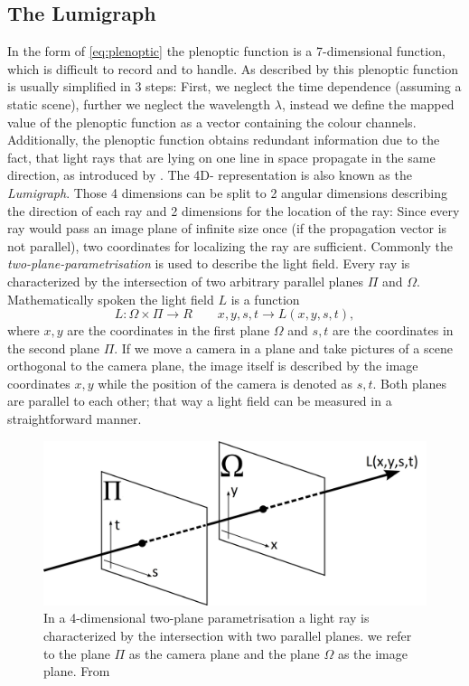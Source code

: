 \documentclass  [
  paper    = a4,
  BCOR     = 10mm,
  twoside,
  fontsize = 12pt,
  fleqn,
  toc      = bibnumbered,
  toc      = listofnumbered,
  numbers  = noendperiod,
  headings = normal,
  listof   = leveldown,
  version  = 3.03
]                                       {scrreprt}
\begin{document}
\subsection{The Lumigraph}
In the form of \ref{eq:plenoptic} the plenoptic function is a 7-dimensional function, which is difficult to record and to handle. As described by \cite{wu2017light} this plenoptic function is usually simplified in 3 steps: First, we neglect the time dependence (assuming a static scene), further we neglect the wavelength $\lambda$, instead we define the mapped value of the plenoptic function as a vector containing the colour channels. 
Additionally, the plenoptic function obtains redundant information due to the fact, that light rays that are lying on one line in space propagate in the same direction, as introduced by \cite{bolles1987epipolar}. The 4D- representation is also known as the \textit{Lumigraph}. Those 4 dimensions can be split to 2 angular dimensions describing the direction of each ray and 2 dimensions for the location of the ray: Since every ray would pass an image plane of infinite size once (if the propagation vector is not parallel), two coordinates for localizing the ray are sufficient. Commonly the \textit{two-plane-parametrisation} is used to describe the light field. Every ray is characterized by the intersection of two arbitrary parallel planes $\Pi$ and $\Omega$. Mathematically spoken the light field $L$ is a function
\begin{equation}\label{key}
L:\Omega\times \Pi \rightarrow \!R\qquad x,y,s,t\rightarrow L(x,y,s,t),
\end{equation}
where $x,y$ are the coordinates in the first plane $\Omega$ and $s,t$ are the coordinates in the second plane $\Pi$. If we move a camera in a plane and take pictures of a scene orthogonal to the camera plane, the image itself is described by the image coordinates $x,y$ while the position of the camera is denoted as $s,t$. Both planes are parallel to each other; that way a light field can be measured in a straightforward manner.
\begin{figure}[h]
	\centering
	\includegraphics[width=0.7\linewidth]{images/twoplane_param}
	\caption[Two-plane parametrisation]{In a 4-dimensional two-plane parametrisation a light ray is characterized by the intersection with two parallel planes. we refer to the plane  $\Pi$ as the camera plane and the plane $\Omega$ as the image plane. From \cite{Xu:12}}
	\label{fig:twoplaneparam}
\end{figure}
\end{document}
